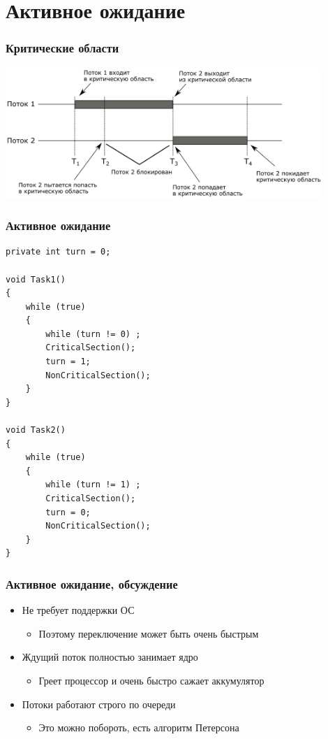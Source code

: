 \documentclass[xetex,mathserif,serif]{beamer}
\begin{document}
	\section{Активное ожидание}

	\begin{frame}
		\frametitle{Критические области}
		\begin{center}
			\includegraphics[width=0.9\textwidth]{criticalSections.png}
		\end{center}
	\end{frame}

	\begin{frame}[fragile]
		\frametitle{Активное ожидание}
		\begin{scriptsize}
			\begin{verbatim}
private int turn = 0;

void Task1()
{
    while (true)
    {
        while (turn != 0) ;
        CriticalSection();
        turn = 1;
        NonCriticalSection();
    }
}

void Task2()
{
    while (true)
    {
        while (turn != 1) ;
        CriticalSection();
        turn = 0;
        NonCriticalSection();
    }
}
			\end{verbatim}
		\end{scriptsize}
	\end{frame}

	\begin{frame}
		\frametitle{Активное ожидание, обсуждение}
		\begin{itemize}
			\item Не требует поддержки ОС
			\begin{itemize}
				\item Поэтому переключение может быть очень быстрым
			\end{itemize}
			\item Ждущий поток полностью занимает ядро
			\begin{itemize}
				\item Греет процессор и очень быстро сажает аккумулятор
			\end{itemize}
			\item Потоки работают строго по очереди
			\begin{itemize}
				\item Это можно побороть, есть алгоритм Петерсона
			\end{itemize}
		\end{itemize}
	\end{frame}
\end{document}
